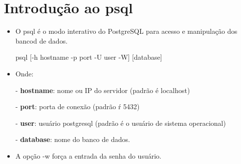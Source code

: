 \section{Introdução ao psql}\setcounter{SteP}{1}
\begin{itemize}
\item{\bf }O psql é o modo interativo do PostgreSQL para acesso e manipulação dos bancod de dados.
\begin{BoxVerbatim}
	psql [-h hostname -p port -U user -W] [database]
\end{BoxVerbatim}
\item{\bf }Onde:

- {\bf hostname}: nome ou IP do servidor (padrão é localhost)

- {\bf port}: porta de conexão (padrão ŕ 5432)

- {\bf user}: usuário postgresql (padrão é o usuário de sistema operacional)

- {\bf database}: nome do banco de dados.

\item{\bf } A opção -w força a entrada da senha do usuário.
\end{itemize}
